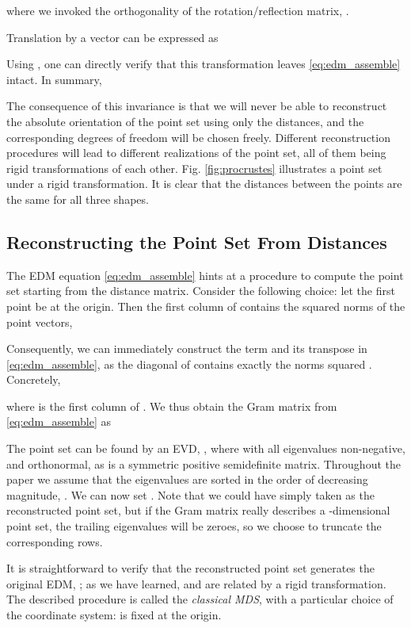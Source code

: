 \documentclass[10pt,double]{IEEEtran}
\newcommand{\rev}[1]{{#1}}
\begin{document}
where we invoked the orthogonality of the rotation/reflection matrix,
.

Translation by a vector  can be expressed as

Using , one can directly verify that this transformation leaves
\eqref{eq:edm_assemble} intact. In summary,


The consequence of this invariance is that we will never be able to
reconstruct the absolute orientation of the point set using only the
distances, and the corresponding degrees of freedom will be chosen freely.
\rev{Different reconstruction procedures will lead to different realizations of the
point set, all of them being rigid transformations of each other.} Fig.
\ref{fig:procrustes} illustrates a point set under a rigid transformation. It
is clear that the distances between the points are the same for all three
shapes.



\subsection{Reconstructing the Point Set From Distances} \label{sub:reconstructing_the_point_set_from_distances}

The EDM equation \eqref{eq:edm_assemble} hints at a procedure to compute the
point set starting from the distance matrix. 
Consider the following choice: let the first point   be at the origin.
Then the first column of  contains the squared norms of the point
vectors,

Consequently, we can immediately construct the term 
and its transpose in \eqref{eq:edm_assemble}, as the diagonal of  contains exactly the norms squared . Concretely, 

where  is the first column of . We thus obtain the Gram matrix
from 
\eqref{eq:edm_assemble} as

The point set can be found by an EVD, , where  with all eigenvalues
 non-negative, and  orthonormal, as  is a symmetric
positive semidefinite matrix. Throughout the paper we assume that the
eigenvalues are sorted in the order of decreasing magnitude, . We can now set
. Note that
we could have simply taken  as the reconstructed point set, but if the Gram matrix really
describes a -dimensional point set, the trailing eigenvalues will be
zeroes, so we choose to truncate the corresponding rows.

\rev{It is straightforward to verify that the reconstructed point set
 generates the original EDM, ; as we have learned,
 and  are related by a rigid transformation. The described procedure
is called the \emph{classical MDS}, with a particular choice of the coordinate
system:  is fixed at the origin.}
\end{document}
